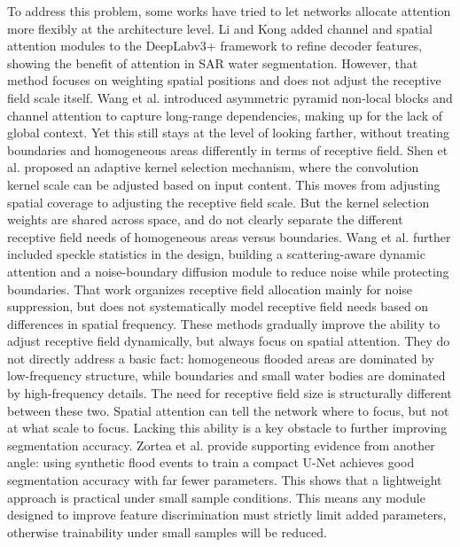 \documentclass[lettersize,journal]{IEEEtran}
\begin{document}
To address this problem, some works have tried to let networks allocate attention more flexibly at the architecture level. Li and Kong \cite{Li2023RemoteSensing} added channel and spatial attention modules to the DeepLabv3+ framework to refine decoder features, showing the benefit of attention in SAR water segmentation. However, that method focuses on weighting spatial positions and does not adjust the receptive field scale itself. Wang et al. \cite{Wang2022NLCANet} introduced asymmetric pyramid non-local blocks and channel attention to capture long-range dependencies, making up for the lack of global context. Yet this still stays at the level of looking farther, without treating boundaries and homogeneous areas differently in terms of receptive field. Shen et al. \cite{Shen2024ELLKNet} proposed an adaptive kernel selection mechanism, where the convolution kernel scale can be adjusted based on input content. This moves from adjusting spatial coverage to adjusting the receptive field scale. But the kernel selection weights are shared across space, and do not clearly separate the different receptive field needs of homogeneous areas versus boundaries. Wang et al. \cite{Wang2025NRSANet} further included speckle statistics in the design, building a scattering-aware dynamic attention and a noise-boundary diffusion module to reduce noise while protecting boundaries. That work organizes receptive field allocation mainly for noise suppression, but does not systematically model receptive field needs based on differences in spatial frequency. These methods gradually improve the ability to adjust receptive field dynamically, but always focus on spatial attention. They do not directly address a basic fact: homogeneous flooded areas are dominated by low-frequency structure, while boundaries and small water bodies are dominated by high-frequency details. The need for receptive field size is structurally different between these two. Spatial attention can tell the network where to focus, but not at what scale to focus. Lacking this ability is a key obstacle to further improving segmentation accuracy. Zortea et al. \cite{Zortea2023IEEE} provide supporting evidence from another angle: using synthetic flood events to train a compact U-Net achieves good segmentation accuracy with far fewer parameters. This shows that a lightweight approach is practical under small sample conditions. This means any module designed to improve feature discrimination must strictly limit added parameters, otherwise trainability under small samples will be reduced.
\end{document}
